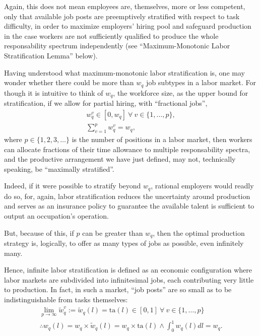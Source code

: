 \documentclass[hidelinks, nonatbib]{elsarticle}
\begin{document}
\begin{definition}
    Again, this does not mean employees are, themselves, more or less competent, only that available job posts are preemptively stratified with respect to task difficulty, in order to maximize employers' hiring pool and safeguard production in the case workers are not sufficiently qualified to produce the whole responsability spectrum independently (see ``Maximum-Monotonic Labor Stratification Lemma'' below).    
\end{definition}
Having understood what maximum-monotonic labor stratification is, one may wonder whether there could be more than $w_q$ job subtypes in a labor market. For though it is intuitive to think of $w_q$, the workforce size, as the upper bound for stratification, if we allow for partial hiring, with ``fractional jobs'',
\begin{gather}
w_{q}^{v} 
\in 
[0, w_q]
\
\forall
\
v \in \{1, \dots, p\}
,
\\
\sum_{v=1}^{p}
w_{q}^{v}
=
w_q
,
\end{gather}
where $p \in \{1, 2, 3, \dots\}$ is the number of positions in a labor market, then workers can allocate fractions of their time allowance to multiple responsability spectra, and the productive arrangement we have just defined, may not, technically speaking, be ``maximally stratified''. 

Indeed, if it were possible to stratify beyond $w_q$, rational employers would readly do so, for, again, labor stratification reduces the uncertainty around production and serves as an insurance policy to guarantee the available talent is sufficient to output an occupation's operation.

But, because of this, if $p$ can be greater than $w_q$, then the optimal production strategy is, logically, to offer as many types of jobs as possible, even infinitely many.

Hence, infinite labor stratification is defined as an economic configuration where labor markets are subdivided into infinitesimal jobs, each contributing very little to production. In fact, in such a market, ``job posts'' are so small as to be indistinguishable from tasks themselves:
\begin{gather}
\lim_{p \rightarrow \infty}{
    \tilde{w}_{q}^{v}
}
:= 
\tilde{w}_{q}(l)
=
\text{ta}(l)
\in [0,1]
\
\forall
\
v \in \{1, \dots, p\}
\\
\therefore
w_{q}(l)
= 
w_q \times \tilde{w}_{q}(l)
=
w_q \times \text{ta}(l)
\land
\int_{0}^{1}{
    w_{q}(l)
    dl
}
=
w_q
.
\end{gather}
\end{document}
